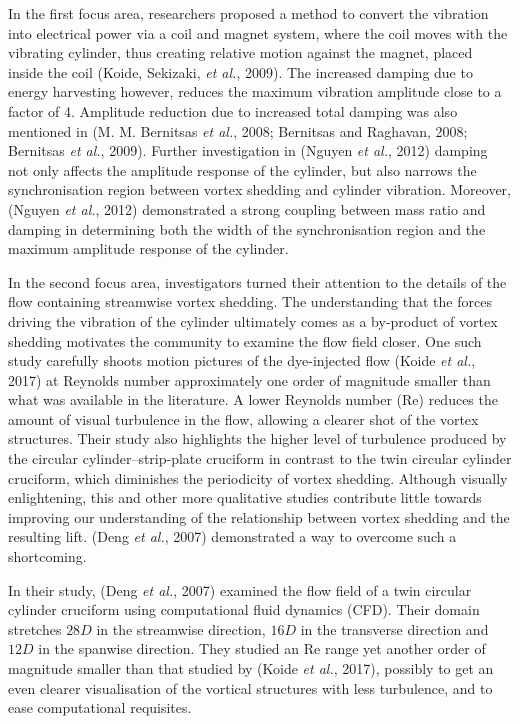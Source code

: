 \documentclass[]{article}
\begin{document}
In the first focus area, researchers proposed a method to convert the
vibration into electrical power via a coil and magnet system, where the
coil moves with the vibrating cylinder, thus creating relative motion
against the magnet, placed inside the coil (Koide, Sekizaki, \emph{et
al.}, 2009). The increased damping due to energy harvesting however,
reduces the maximum vibration amplitude close to a factor of 4.
Amplitude reduction due to increased total damping was also mentioned in
(M. M. Bernitsas \emph{et al.}, 2008; Bernitsas and Raghavan, 2008;
Bernitsas \emph{et al.}, 2009). Further investigation in (Nguyen
\emph{et al.}, 2012) damping not only affects the amplitude response of
the cylinder, but also narrows the synchronisation region between vortex
shedding and cylinder vibration. Moreover, (Nguyen \emph{et al.}, 2012)
demonstrated a strong coupling between mass ratio and damping in
determining both the width of the synchronisation region and the maximum
amplitude response of the cylinder.

In the second focus area, investigators turned their attention to the
details of the flow containing streamwise vortex shedding. The
understanding that the forces driving the vibration of the cylinder
ultimately comes as a by-product of vortex shedding motivates the
community to examine the flow field closer. One such study carefully
shoots motion pictures of the dye-injected flow (Koide \emph{et al.},
2017) at Reynolds number approximately one order of magnitude smaller
than what was available in the literature. A lower Reynolds number (Re)
reduces the amount of visual turbulence in the flow, allowing a clearer
shot of the vortex structures. Their study also highlights the higher
level of turbulence produced by the circular cylinder--strip-plate
cruciform in contrast to the twin circular cylinder cruciform, which
diminishes the periodicity of vortex shedding. Although visually
enlightening, this and other more qualitative studies contribute little
towards improving our understanding of the relationship between vortex
shedding and the resulting lift. (Deng \emph{et al.}, 2007) demonstrated
a way to overcome such a shortcoming.

In their study, (Deng \emph{et al.}, 2007) examined the flow field of a
twin circular cylinder cruciform using computational fluid dynamics
(CFD). Their domain stretches \(28D\) in the streamwise direction,
\(16D\) in the transverse direction and \(12D\) in the spanwise
direction. They studied an Re range yet another order of magnitude
smaller than that studied by (Koide \emph{et al.}, 2017), possibly to
get an even clearer visualisation of the vortical structures with less
turbulence, and to ease computational requisites.
\end{document}
